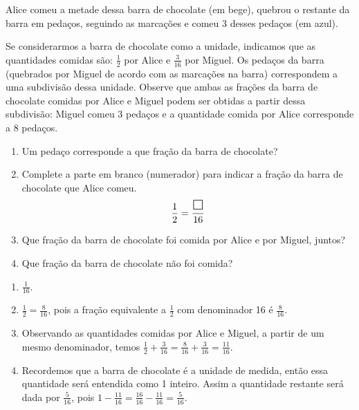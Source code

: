 \documentclass[10 pt,usenames,dvipsnames, oneside]{article}
\begin{document}
Alice comeu a metade dessa barra de chocolate (em bege), quebrou o restante da barra em pedaços, seguindo as marcações e comeu 3 desses pedaços (em azul).

\begin{center}
\end{center}

Se considerarmos a barra de chocolate como a unidade, indicamos que as quantidades comidas são: $\frac{1}{2}$ por Alice e $\frac{3}{16}$ por Miguel.
Os pedaços da barra (quebrados por Miguel de acordo com as marcações na barra) correspondem a uma subdivisão dessa unidade.
Observe que ambas as frações da barra de chocolate comidas por Alice e Miguel podem ser obtidas a partir dessa subdivisão: Miguel comeu 3 pedaços e a quantidade comida por Alice corresponde a 8 pedaços.
\begin{enumerate}
\item Um pedaço corresponde a que fração da barra de chocolate?
\item Complete a parte em branco (numerador) para indicar a fração da barra de chocolate que Alice comeu.
$$\frac{1}{2} = \frac{\text{\Large $\square$} }{16}$$
\item Que fração da barra de chocolate foi comida por Alice e por Miguel, juntos?
\item  Que fração da barra de chocolate não foi comida?
\end{enumerate}

\ifdefined\prof
\begin{solucao}

\begin{enumerate}
     \item $\frac{1}{16}$.
     \item $\frac{1}{2}=\frac{8}{16}$, pois a fração equivalente a $\frac{1}{2}$ com denominador 16 é $\frac{8}{16}$.
     \item Observando as quantidades comidas por Alice e Miguel, a partir de um mesmo denominador, temos $\frac{1}{2}+\frac{3}{16} = \frac{8}{16} + \frac{3}{16} = \frac{11}{16}$.
     \item Recordemos que a barra de chocolate é a unidade de medida, então essa quantidade será entendida como 1 inteiro. Assim a quantidade restante será dada por $\frac{5}{16}$, pois $1 - \frac{11}{16} = \frac{16}{16} - \frac{11}{16} = \frac{5}{16}$.
\end{enumerate}

\end{solucao}
\fi
\end{document}
